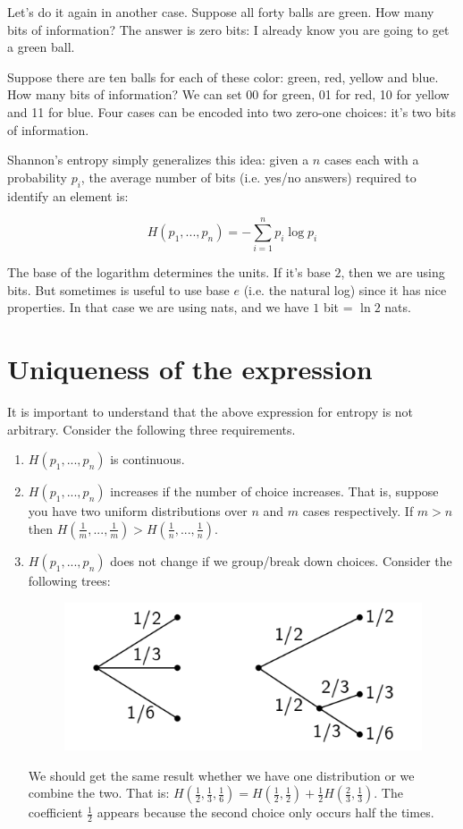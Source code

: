 \documentclass[aps,pra,10pt,floatfix,nofootinbib]{revtex4-1}
\theoremstyle{definition}
\begin{document}
Let's do it again in another case. Suppose all forty balls are green. How many bits of information? The answer is zero bits: I already know you are going to get a green ball.

Suppose there are ten balls for each of these color: green, red, yellow and blue. How many bits of information? We can set 00 for green, 01 for red, 10 for yellow and 11 for blue. Four cases can be encoded into two zero-one choices: it's two bits of information.

Shannon's entropy simply generalizes this idea: given a $n$ cases each with a probability $p_i$, the average number of bits (i.e. yes/no answers) required to identify an element is:

\begin{equation}
\label{ShannonEntropy}
H(p_1, ..., p_n) = - \sum_{i=1}^{n} p_i \log p_i
\end{equation}

The base of the logarithm determines the units. If it's base $2$, then we are using bits. But sometimes is useful to use base $e$ (i.e. the natural log) since it has nice properties. In that case we are using nats, and we have $1$ bit = $\ln 2$ nats.

\section{Uniqueness of the expression}

It is important to understand that the above expression for entropy is not arbitrary. Consider the following three requirements.

\begin{enumerate}
	\item $H(p_1, ..., p_n)$ is continuous.
	\item $H(p_1, ..., p_n)$ increases if the number of choice increases. That is, suppose you have two uniform distributions over $n$ and $m$ cases respectively. If $m>n$ then $H(\frac{1}{m}, ..., \frac{1}{m})>H(\frac{1}{n}, ..., \frac{1}{n})$.
	\item $H(p_1, ..., p_n)$ does not change if we group/break down choices. Consider the following trees:
	\begin{figure}[h]
	\includegraphics[scale=0.50]{ShannonTree}
	\centering
	\end{figure}
	
	We should get the same result whether we have one distribution or we combine the two. That is: $H(\frac{1}{2}, \frac{1}{3}, \frac{1}{6}) = H(\frac{1}{2},\frac{1}{2}) + \frac{1}{2} H(\frac{2}{3}, \frac{1}{3})$. The coefficient $\frac{1}{2}$ appears because the second choice only occurs half the times.
\end{enumerate}
\end{document}
